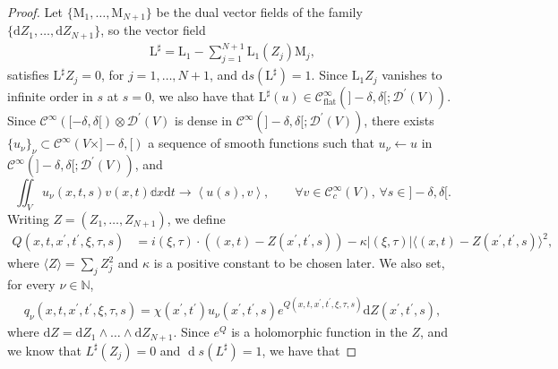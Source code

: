 \documentclass[11pt]{amsart}
\DeclareMathOperator{\ourd}{d}
\theoremstyle{definition}
\theoremstyle{remark}
\theoremstyle{plain}
\begin{document}
\begin{proof}
Let $\{\mathrm{M}_1, \dots, \mathrm{M}_{N+1}\}$ be the dual vector fields of the family $\{\mathrm{d}Z_1, \dots, \mathrm{d}Z_{N+1}\}$, so the vector field
%
\begin{align*}
	\mathrm{L}^\sharp = \mathrm{L}_1 - \sum_{j = 1}^{N + 1} \mathrm{L}_1(Z_j) \mathrm{M}_j,
\end{align*}
%
satisfies $\mathrm{L}^\sharp Z_j = 0$, for $j = 1, \dots, N + 1$, and $\mathrm{d}s (\mathrm{L}^\sharp) = 1$. Since $\mathrm{L}_1 Z_j$ vanishes to infinite order in $s$ at $s = 0$, we also have that $\mathrm{L}^\sharp (u) \in \mathcal{C}_\text{flat}^\infty(]-\delta, \delta[; \mathcal{D}^\prime(V))$. %
Since $\mathcal{C}^\infty([-\delta, \delta[) \otimes \mathcal{D}^\prime(V)$ is dense in $\mathcal{C}^\infty(]-\delta, \delta[; \mathcal{D}^\prime(V))$, there exists $\{u_\nu\}_\nu \subset \mathcal{C}^\infty(V \times ]-\delta,[)$ a sequence of smooth functions such that $u_\nu \longleftarrow u$ in $\mathcal{C}^\infty(]-\delta, \delta[; \mathcal{D}^\prime(V))$, and 
%
\[
	\iint_V u_\nu(x,t,s) v(x,t) \mathbb{d} x \mathrm{d}t \longrightarrow \left\langle u(s), v \right\rangle, \qquad  \forall v \in \mathcal{C}_c^\infty(V), \,\forall s \in ]-\delta, \delta[.
\]
%
Writing $Z = (Z_1, \dots , Z_{N+1})$, we define
%
\begin{align*}
	Q(x,t,x^\prime, t^\prime, \xi,\tau, s) & =  i (\xi,\tau) \cdot ((x,t) - Z(x^\prime, t^\prime,s)) - \kappa|(\xi, \tau)|\langle (x,t) - Z(x^\prime, t^\prime, s)\rangle^2,
\end{align*}
%
where $\langle Z \rangle = \sum_j Z_j^2$ and $\kappa$ is a positive constant to be chosen later.  We also set, for every $\nu \in \mathbb{N}$,
%
\begin{align*}
	q_\nu(x,t,x^\prime, t^\prime, \xi,\tau, s) = \chi(x^\prime,t^\prime) u_\nu(x^\prime, t^\prime,s)e^{Q(x,t,x^\prime, t^\prime, \xi,\tau, s)}\mathrm{d}Z(x^\prime,t^\prime, s),
\end{align*}
%
where $\mathrm{d}Z = \mathrm{d}Z_1 \wedge \dots \wedge \mathrm{d}Z_{N+1}$. Since $e^Q$ is a holomorphic function in the $Z$, and we know that $L^\sharp (Z_j) = 0$ and $\ourd s (L^\sharp) =1$, we have that
%

\end{proof}
\end{document}
